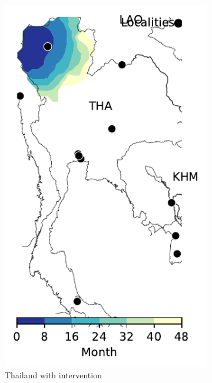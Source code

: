 \documentclass[11pt]{article}
\theoremstyle{definition}
\begin{document}
\begin{figure}[ht]
\begin{subfigure}[b]{.28\textwidth}
\includegraphics[width=\textwidth]{../cellular_automata/results/contour/TH_model-B_precip1-out-100_m1_l3.pdf}
\caption{Thailand with intervention\label{fig:thlBContourInt}}
\end{subfigure}
\begin{subfigure}[b]{.43\textwidth}

\end{subfigure}
\end{figure}
\end{document}
